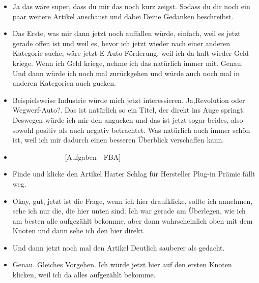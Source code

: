 {\begin{itemize}[]
                  Wenn ich jetzt aber mich noch nicht damit auskennen würde, dann wäre mir das wahrscheinlich nicht so klar.
                  Dann müsste ich mir wahrscheinlich alle Artikel durchlesen, um dann wirklich diese Gegenposition zu finden.
                  Genau so würde ich mich jetzt weiter vorarbeiten.
            \item {} Ja das wäre super, dass du mir das noch kurz zeigst.
                  Sodass du dir noch ein paar weitere Artikel anschaust und dabei Deine Gedanken beschreibst.
            \item {} Das Erste, was mir dann jetzt noch auffallen würde, einfach, weil es jetzt gerade offen ist und weil es, bevor ich jetzt wieder nach einer anderen Kategorie suche, wäre jetzt \flqq E-Auto Förderung\frqq{}, weil ich da halt wieder Geld kriege.
                  Wenn ich Geld kriege, nehme ich das natürlich immer mit.
                  Genau.
                  Und dann würde ich noch mal zurückgehen und würde auch noch mal in anderen Kategorien auch gucken.
            \item {} Beispielsweise Industrie würde mich jetzt interessieren.
                  Ja,\flqq Revolution oder Wegwerf-Auto?\frqq{}.
                  Das ist natürlich so ein Titel, der direkt ins Auge springt.
                  Deswegen würde ich mir den angucken und das ist jetzt sogar beides, also sowohl positiv als auch negativ betrachtet.
                  Was natürlich auch immer schön ist, weil ich mir dadurch einen besseren Überblick verschaffen kann.
            \item {---------------------} [Aufgaben - FBA] {---------------------}
            \item {} Finde und klicke den Artikel \flqq Harter Schlag für Hersteller Plug-in Prämie fällt weg\frqq{}.
            \item {} Okay, gut, jetzt ist die Frage, wenn ich hier draufklicke, sollte ich annehmen, sehe ich nur die, die hier unten sind.
                  Ich war gerade am Überlegen, wie ich am besten alle aufgezählt bekomme, aber dann wahrscheinlich oben mit dem Knoten und dann sehe ich den hier direkt.
            \item {} Und dann jetzt noch mal den Artikel \flqq Deutlich sauberer als gedacht\frqq{}.
            \item {} Genau. Gleiches Vorgehen. Ich würde jetzt hier auf den ersten Knoten klicken, weil ich da alles aufgezählt bekomme.

\end{itemize}}
